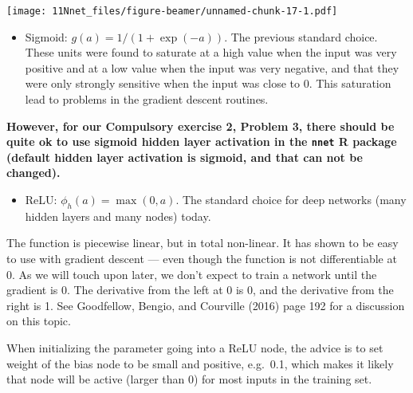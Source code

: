 \documentclass[10pt,ignorenonframetext,]{beamer}
\providecommand{\tightlist}{%
  \setlength{\itemsep}{0pt}\setlength{\parskip}{0pt}}
\begin{document}
\begin{frame}

\texttt{[image: 11Nnet\_files/figure-beamer/unnamed-chunk-17-1.pdf]}

\end{frame}

\begin{frame}[fragile]

\begin{itemize}
\tightlist
\item
  Sigmoid: \(g(a)=1/(1+\exp(-a))\). The previous standard choice. These
  units were found to saturate at a high value when the input was very
  positive and at a low value when the input was very negative, and that
  they were only strongly sensitive when the input was close to 0. This
  saturation lead to problems in the gradient descent routines.
\end{itemize}

\textbf{However, for our Compulsory exercise 2, Problem 3, there should
be quite ok to use sigmoid hidden layer activation in the \texttt{nnet}
R package (default hidden layer activation is sigmoid, and that can not
be changed).}

\end{frame}

\begin{frame}

\begin{itemize}
\tightlist
\item
  ReLU: \(\phi_h(a)=\max(0,a)\). The standard choice for deep networks
  (many hidden layers and many nodes) today.
\end{itemize}

The function is piecewise linear, but in total non-linear. It has shown
to be easy to use with gradient descent --- even though the function is
not differentiable at 0. As we will touch upon later, we don't expect to
train a network until the gradient is 0. The derivative from the left at
0 is 0, and the derivative from the right is 1. See Goodfellow, Bengio,
and Courville (2016) page 192 for a discussion on this topic.

When initializing the parameter going into a ReLU node, the advice is to
set weight of the bias node to be small and positive, e.g.~0.1, which
makes it likely that node will be active (larger than 0) for most inputs
in the training set.

\end{frame}
\end{document}
